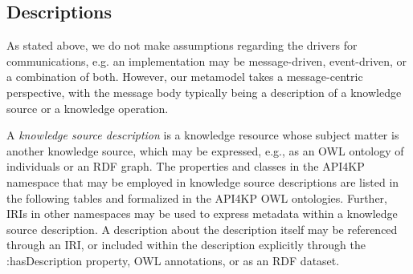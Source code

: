 \documentclass[runningheads]{llncs}
\begin{document}



\subsection{Descriptions}
As stated above, we do not make assumptions regarding the drivers for communications, e.g. an implementation may be message-driven, event-driven, or a combination of both. However, our metamodel takes a message-centric perspective, with the message body typically being a description of a knowledge source or a knowledge operation.

A \emph{knowledge source description} is a knowledge resource whose subject matter is another knowledge source, which may be expressed, e.g., as an OWL ontology of individuals or an RDF graph. The properties and classes in the API4KP namespace that may be employed in knowledge source descriptions are listed in the following tables and formalized in the API4KP OWL ontologies. Further, IRIs in other namespaces may be used to express metadata within a knowledge source description. A description about the description itself may be referenced through an IRI, or included within the description explicitly through the :hasDescription property,  OWL annotations, or as an RDF dataset\cite{RDF2014b}.
\end{document}

